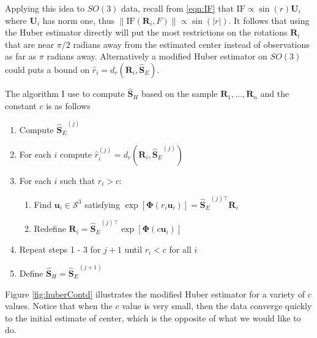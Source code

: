 \documentclass{article}\usepackage{graphicx, color}
\newcommand{\ProjMean}{{\widehat{\bm S}_{E}}}
\newcommand{\HuberMean}{{\widehat{\bm S}_H}}
\begin{document}
Applying this idea to $SO(3)$ data, recall from \eqref{eqn:IF} that $\text{IF}\propto\sin(r)\bm U_i$ where $\bm U_i$ has norm one, thus $\|\text{IF}(\bm R_i,F)\|\propto \sin(|r|)$.  It follows that using the Huber estimator directly will put the most restrictions on the rotations $\bm R_i$ that are near $\pi/2$ radians away from the estimated center instead of observations as far as $\pi$ radians away.  Alternatively a modified Huber estimator on $SO(3)$ could puts a bound on $\hat r_i=d_r(\bm R_i,\ProjMean)$.  

The algorithm I use to compute $\HuberMean$ based on the sample $\bm R_1,\dots,\bm R_n$ and the constant $c$ is as follows
\begin{enumerate} 
\item Compute $\ProjMean^{(j)}$
\item For each $i$ compute $\hat r_i^{(j)}=d_r(\bm R_i,\ProjMean^{(j)})$
\item For each $i$ such that $r_i>c$:
\begin{enumerate}
\item Find $\bm u_i\in\mathcal{S}^3$ satisfying $\exp[\bm{\Phi}(r_i\bm u_i)]=\ProjMean^{(j)\top}\bm R_i$
\item Redefine $\bm R_i=\ProjMean^{(j)\top}\exp[\bm{\Phi}(c\bm u_i)]$
\end{enumerate}
\item Repeat steps 1 - 3 for $j+1$ until $r_i<c$ for all $i$
\item Define $\HuberMean=\ProjMean^{(j+1)}$
\end{enumerate}
Figure \ref{fig:huberContd} illustrates the modified Huber estimator for a variety of $c$ values.  Notice that when the $c$ value is very small, then the data converge quickly to the initial estimate of center, which is the opposite of what we would like to do.

\end{document}
